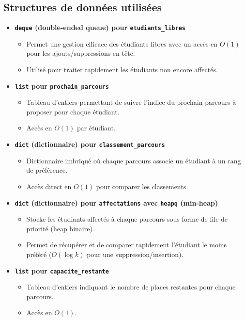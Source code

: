 \documentclass[a4paper,11pt]{article}
\begin{document}
\subsection{Structures de données utilisées}
\begin{itemize}
    \item \textbf{\texttt{deque} (double-ended queue) pour \texttt{etudiants\_libres}}
    \begin{itemize}
        \item Permet une gestion efficace des étudiants libres avec un accès en $O(1)$ pour les ajouts/suppressions en tête.
        \item Utilisé pour traiter rapidement les étudiants non encore affectés.
    \end{itemize}
    
    \item \textbf{\texttt{list} pour \texttt{prochain\_parcours}}
    \begin{itemize}
        \item Tableau d’entiers permettant de suivre l’indice du prochain parcours à proposer pour chaque étudiant.
        \item Accès en $O(1)$ par étudiant.
    \end{itemize}
    
    \item \textbf{\texttt{dict} (dictionnaire) pour \texttt{classement\_parcours}}
    \begin{itemize}
        \item Dictionnaire imbriqué où chaque parcours associe un étudiant à un rang de préférence.
        \item Accès direct en $O(1)$ pour comparer les classements.
    \end{itemize}
    
    \item \textbf{\texttt{dict} (dictionnaire) pour \texttt{affectations} avec \texttt{heapq} (min-heap)}
    \begin{itemize}
        \item Stocke les étudiants affectés à chaque parcours sous forme de file de priorité (heap binaire).
        \item Permet de récupérer et de comparer rapidement l’étudiant le moins préféré ($O(\log k)$ pour une suppression/insertion).
    \end{itemize}
    
    \item \textbf{\texttt{list} pour \texttt{capacite\_restante}}
    \begin{itemize}
        \item Tableau d’entiers indiquant le nombre de places restantes pour chaque parcours.
        \item Accès en $O(1)$.
    \end{itemize}
\end{itemize}
\end{document}
